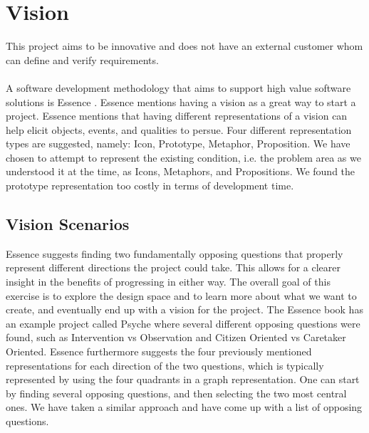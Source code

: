 
\section{Vision}
\label{sec:vision}

This project aims to be innovative and does not have an external customer whom can define and verify requirements. 
\\\\
A software development methodology that aims to support high value software solutions is Essence . Essence mentions having a vision as a great way to start a project. Essence mentions that having different representations of a vision can help elicit objects, events, and qualities to persue. Four different representation types are suggested, namely: Icon, Prototype, Metaphor, Proposition. We have chosen to attempt to represent the existing condition, i.e. the problem area as we understood it at the time, as Icons, Metaphors, and Propositions. We found the prototype representation too costly in terms of development time. 

\subsection{Vision Scenarios}
\label{sub:vision_scenarios}

Essence suggests finding two fundamentally opposing questions that properly represent different directions the project could take. This allows for a clearer insight in the benefits of progressing in either way. The overall goal of this exercise is to explore the design space and to learn more about what we want to create, and eventually end up with a vision for the project. The Essence book has an example project called Psyche where several different opposing questions were found, such as Intervention vs Observation and Citizen Oriented vs Caretaker Oriented. Essence furthermore suggests the four previously mentioned representations for each direction of the two questions, which is typically represented by using the four quadrants in a graph representation. One can start by finding several opposing questions, and then selecting the two most central ones. We have taken a similar approach and have come up with a list of opposing questions.

